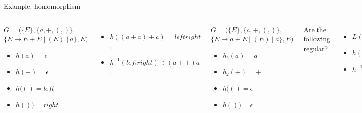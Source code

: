 \documentclass[handout]{beamer}
\begin{document}
  
\begin{frame}{Example: homomorphism}
        
    \begin{columns}

    
        \begin{example}
            $G=(\{E\},\{a,+,(,)\},$ $\{E\rightarrow E+E\mid (E)\mid a\},E)$        
            \begin{itemize}            
                \item $h(a)=\epsilon$
                \item $h(+)=\epsilon$
                \item $h(()=left$
                \item $h())=right$               
            \end{itemize}
        \end{example}
        \begin{itemize}
            \item $h((a+a)+a)=leftright $,
            \item $h^{-1}(leftright)\ni (a++)a$.
        \end{itemize}

        \vspace{1.75cm}
    

        \begin{example}
            $G=(\{E\},\{a,+,(,)\},$ $\{E\rightarrow a+E\mid (E)\mid a\},E)$
            \begin{itemize}
                \item $h_2(a)=a$
                \item $h_2(+)=+$
                \item $h(()=\epsilon$
                \item $h())=\epsilon$
            \end{itemize}
        \end{example}
        Are the following regular?
        \begin{itemize}
            \item $L(G)$
            \item $h(L(G))$
            \item $h^{-1}(h(L(G)))$
        \end{itemize}
        Is $h^{-1}(h(L(G)))=L(G)$?       
        
    \end{columns}
            
\end{frame}
\end{document}
